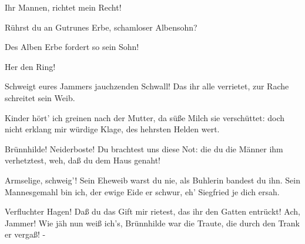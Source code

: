 \begin{drama}
Ihr Mannen, richtet mein Recht!
 

\Guntherspeaks

Rührst du an Gutrunes Erbe,
schamloser Albensohn?
 

\Hagenspeaks



Des Alben Erbe fordert so sein Sohn!
 



Her den Ring!
 






\Brunnhildespeaks



Schweigt eures Jammers
jauchzenden Schwall!
Das ihr alle verrietet,
zur Rache schreitet sein Weib.


Kinder hört' ich greinen nach der Mutter,
da süße Milch sie verschüttet:
doch nicht erklang mir würdige Klage,
des hehrsten Helden wert.
 

\Gutrunespeaks



Brünnhilde! Neiderboste!
Du brachtest uns diese Not:
die du die Männer ihm verhetztest,
weh, daß du dem Haus genaht!
 

\Brunnhildespeaks

Armselige, schweig'!
Sein Eheweib warst du nie,
als Buhlerin bandest du ihn.
Sein Mannesgemahl bin ich,
der ewige Eide er schwur,
eh' Siegfried je dich ersah.
 

\Gutrunespeaks



Verfluchter Hagen!
Daß du das Gift mir rietest,
das ihr den Gatten entrückt!
Ach, Jammer!
Wie jäh nun weiß ich's,
Brünnhilde war die Traute,
die durch den Trank er vergaß! -
 





\end{drama}

